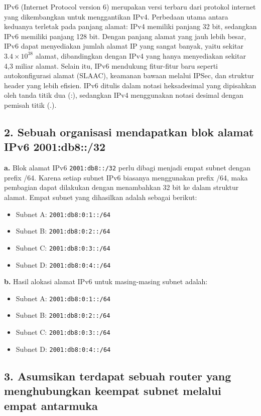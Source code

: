 IPv6 (Internet Protocol version 6) merupakan versi terbaru dari protokol internet yang dikembangkan untuk menggantikan IPv4. Perbedaan utama antara keduanya terletak pada panjang alamat: IPv4 memiliki panjang 32 bit, sedangkan IPv6 memiliki panjang 128 bit. Dengan panjang alamat yang jauh lebih besar, IPv6 dapat menyediakan jumlah alamat IP yang sangat banyak, yaitu sekitar $3.4 \times 10^{38}$ alamat, dibandingkan dengan IPv4 yang hanya menyediakan sekitar 4,3 miliar alamat. Selain itu, IPv6 mendukung fitur-fitur baru seperti autokonfigurasi alamat (SLAAC), keamanan bawaan melalui IPSec, dan struktur header yang lebih efisien. IPv6 ditulis dalam notasi heksadesimal yang dipisahkan oleh tanda titik dua (:), sedangkan IPv4 menggunakan notasi desimal dengan pemisah titik (.).

\subsection*{2. Sebuah organisasi mendapatkan blok alamat IPv6 2001:db8::/32}

\textbf{a.} Blok alamat IPv6 \texttt{2001:db8::/32} perlu dibagi menjadi empat subnet dengan prefix /64. Karena setiap subnet IPv6 biasanya menggunakan prefix /64, maka pembagian dapat dilakukan dengan menambahkan 32 bit ke dalam struktur alamat. Empat subnet yang dihasilkan adalah sebagai berikut:
\begin{itemize}
    \item Subnet A: \texttt{2001:db8:0:1::/64}
    \item Subnet B: \texttt{2001:db8:0:2::/64}
    \item Subnet C: \texttt{2001:db8:0:3::/64}
    \item Subnet D: \texttt{2001:db8:0:4::/64}
\end{itemize}

\textbf{b.} Hasil alokasi alamat IPv6 untuk masing-masing subnet adalah:
\begin{itemize}
    \item Subnet A: \texttt{2001:db8:0:1::/64}
    \item Subnet B: \texttt{2001:db8:0:2::/64}
    \item Subnet C: \texttt{2001:db8:0:3::/64}
    \item Subnet D: \texttt{2001:db8:0:4::/64}
\end{itemize}

\subsection*{3. Asumsikan terdapat sebuah router yang menghubungkan keempat subnet melalui empat antarmuka}

